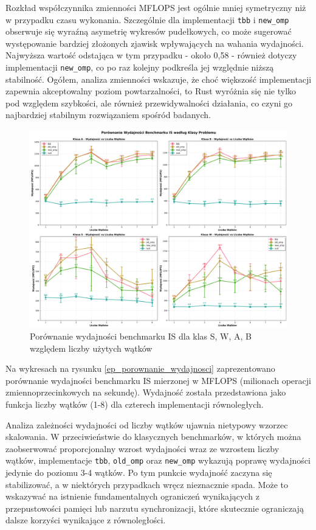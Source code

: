 Rozkład współczynnika zmienności MFLOPS jest ogólnie mniej symetryczny niż w przypadku czasu wykonania. Szczególnie dla implementacji \texttt{tbb} i \texttt{new\_omp} obserwuje się wyraźną asymetrię wykresów pudełkowych, co może sugerować występowanie bardziej złożonych zjawisk wpływających na wahania wydajności. Najwyższa wartość odstająca w tym przypadku - około 0,58 - również dotyczy implementacji \texttt{new\_omp}, co po raz kolejny podkreśla jej względnie niższą stabilność. Ogółem, analiza zmienności wskazuje, że choć większość implementacji zapewnia akceptowalny poziom powtarzalności, to Rust wyróżnia się nie tylko pod względem szybkości, ale również przewidywalności działania, co czyni go najbardziej stabilnym rozwiązaniem spośród badanych.
\begin{figure}[H]
    \centering
    \includegraphics[width=\textwidth]{analiza/images/parallel/is/arm/is_porownanie_wydajnosci.png}
    \caption{Porównanie wydajności benchmarku IS dla klas S, W, A, B względem liczby użytych wątków}
    \label{is_porownanie_wydajnosci}
\end{figure}
Na wykresach na rysunku \ref{ep_porownanie_wydajnosci} zaprezentowano porównanie wydajności benchmarku IS mierzonej w MFLOPS (milionach operacji zmiennoprzecinkowych na sekundę). Wydajność została przedstawiona jako funkcja liczby wątków (1-8) dla czterech implementacji równoległych.

Analiza zależności wydajności od liczby wątków ujawnia nietypowy wzorzec skalowania. W przeciwieństwie do klasycznych benchmarków, w których można zaobserwować proporcjonalny wzrost wydajności wraz ze wzrostem liczby wątków, implementacje \texttt{tbb}, \texttt{old\_omp} oraz \texttt{new\_omp} wykazują poprawę wydajności jedynie do poziomu 3-4 wątków. Po tym punkcie wydajność zaczyna się stabilizować, a w niektórych przypadkach wręcz nieznacznie spada. Może to wskazywać na istnienie fundamentalnych ograniczeń wynikających z przepustowości pamięci lub narzutu synchronizacji, które skutecznie ograniczają dalsze korzyści wynikające z równoległości.

